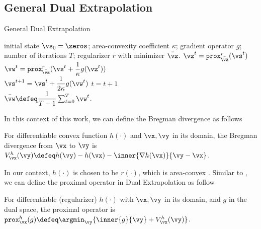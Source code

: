 \subsection{General Dual Extrapolation}
\begin{algorithm}
    \caption{General Dual Extrapolation}
    \label{alg:General_Dual_Extrapolation}
    \begin{algorithmic}[1]
    \REQUIRE initial state $\vs_0 = \zeros$; area-convexity coefficient $\kappa$; gradient operator $g$; number of iterations $T$; regularizer $r$ with minimizer $\Bar{\vz}$.
            \STATE $\vz^t = \mathtt{prox}^r_{\Bar{\vz}}(\vs^t)$\\
            \STATE $\vw^t = \mathtt{prox}^r_{\Bar{\vz}}(\vs^t + \dfrac{1}{\kappa} g(\vz^t) )$\\
            \STATE $\vs^{t+1} = \vs^t + \dfrac{1}{2 \kappa} g(\vw^t)$
            \STATE $t = t+1$\\
        \ENDFOR
    \ENSURE $\Bar{\vw} \defeq \dfrac{1}{T-1}
    \sum_{t=0}^T \vw^t$.
    \end{algorithmic}
\end{algorithm}
In this context of this work, we can define the Bregman divergence as follows
\begin{definition}
    For differentiable convex function $h(\cdot)$ and $\vx, \vy$ in its domain, the Bregman divergence from $\vx$ to $\vy$ is $V^h_\vx(\vy) \defeq h(\vy) - h(\vx) - \inner{\nabla h(\vx)}{\vy - \vx}$.
\end{definition}
In our context, $h(\cdot)$ is chosen to be $r(\cdot)$, which is area-convex \citep[Definition 1.2]{Sherman-2017-Area}. Similar to \citep[Definition 2.5]{Jambulapati-2019-Direct}, we can define the proximal operator 
in Dual Extrapolation as follow 
\begin{definition}
    For differentiable (regularizer) $h(\cdot)$ with $\vx, \vy$ in its domain, and $g$ in the dual space, the proximal operator is $\mathtt{prox}^h_{\vx}(g) \defeq \argmin_\vy \{ \inner{g}{\vy} + V^h_\vx(\vy)\}$.
\end{definition}

